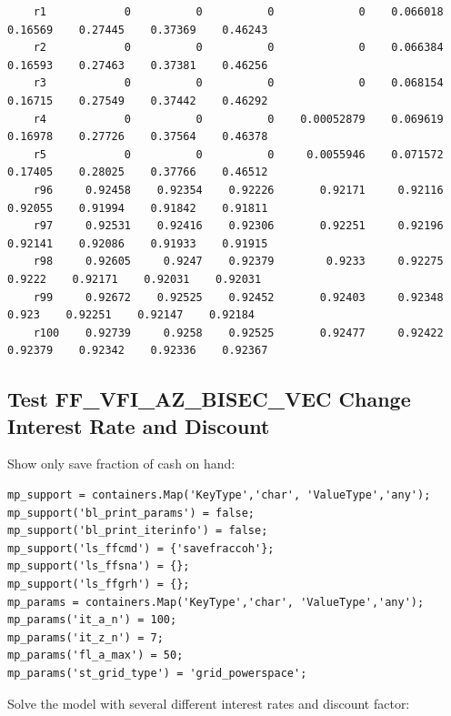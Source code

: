 \documentclass[
]{book}
\begin{document}
\begin{verbatim}
    r1            0          0          0             0    0.066018    0.16569    0.27445    0.37369    0.46243
    r2            0          0          0             0    0.066384    0.16593    0.27463    0.37381    0.46256
    r3            0          0          0             0    0.068154    0.16715    0.27549    0.37442    0.46292
    r4            0          0          0    0.00052879    0.069619    0.16978    0.27726    0.37564    0.46378
    r5            0          0          0     0.0055946    0.071572    0.17405    0.28025    0.37766    0.46512
    r96     0.92458    0.92354    0.92226       0.92171     0.92116    0.92055    0.91994    0.91842    0.91811
    r97     0.92531    0.92416    0.92306       0.92251     0.92196    0.92141    0.92086    0.91933    0.91915
    r98     0.92605     0.9247    0.92379        0.9233     0.92275     0.9222    0.92171    0.92031    0.92031
    r99     0.92672    0.92525    0.92452       0.92403     0.92348      0.923    0.92251    0.92147    0.92184
    r100    0.92739     0.9258    0.92525       0.92477     0.92422    0.92379    0.92342    0.92336    0.92367
\end{verbatim}

\hypertarget{test-ff_vfi_az_bisec_vec-change-interest-rate-and-discount}{%
\subsection{Test FF\_VFI\_AZ\_BISEC\_VEC Change Interest Rate and Discount}\label{test-ff_vfi_az_bisec_vec-change-interest-rate-and-discount}}

Show only save fraction of cash on hand:

\begin{verbatim}
mp_support = containers.Map('KeyType','char', 'ValueType','any');
mp_support('bl_print_params') = false;
mp_support('bl_print_iterinfo') = false;
mp_support('ls_ffcmd') = {'savefraccoh'};
mp_support('ls_ffsna') = {};
mp_support('ls_ffgrh') = {};
mp_params = containers.Map('KeyType','char', 'ValueType','any');
mp_params('it_a_n') = 100;
mp_params('it_z_n') = 7;
mp_params('fl_a_max') = 50;
mp_params('st_grid_type') = 'grid_powerspace';
\end{verbatim}

Solve the model with several different interest rates and discount
factor:
\end{document}
